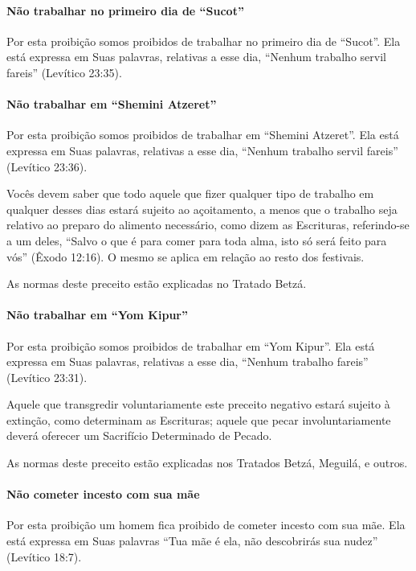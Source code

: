 \paragraph{Não trabalhar no primeiro dia de ``Sucot''}

Por esta proibição somos proibidos de trabalhar no primeiro dia de
``Sucot''. Ela está expressa em Suas palavras, relativas a esse dia,
``Nenhum trabalho servil fareis'' (Levítico 23:35).

\paragraph{Não trabalhar em ``Shemini Atzeret''}

Por esta proibição somos proibidos de trabalhar em ``Shemini Atzeret''.
Ela está expressa em Suas palavras, relativas a esse dia, ``Nenhum
trabalho servil fareis'' (Levítico 23:36).

Vocês devem saber que todo aquele que fizer qualquer tipo de trabalho em
qualquer desses dias estará sujeito ao açoitamento, a menos que o
trabalho seja relativo ao preparo do alimento necessário, como dizem as
Escrituras, referindo-se a um deles, ``Salvo o que é
para comer para toda alma, isto só será feito para vós'' (Êxodo 12:16).
O mesmo se aplica em relação ao resto dos festivais.

As normas deste preceito estão explicadas no Tratado Betzá.

\paragraph{Não trabalhar em ``Yom Kipur''}

Por esta proibição somos proibidos de trabalhar em ``Yom Kipur''. Ela
está expressa em Suas palavras, relativas a esse dia, ``Nenhum trabalho
fareis'' (Levítico 23:31).

Aquele que transgredir voluntariamente este preceito negativo estará
sujeito à extinção, como determinam as Escrituras; aquele que pecar
involuntariamente deverá oferecer um Sacrifício Determinado de Pecado.

As normas deste preceito estão explicadas nos Tratados Betzá, Meguilá, e
outros.

\paragraph{Não cometer incesto com sua mãe}

Por esta proibição um homem fica proibido de cometer incesto com sua
mãe. Ela está expressa em Suas palavras ``Tua mãe é ela, não descobrirás
sua nudez'' (Levítico 18:7).

